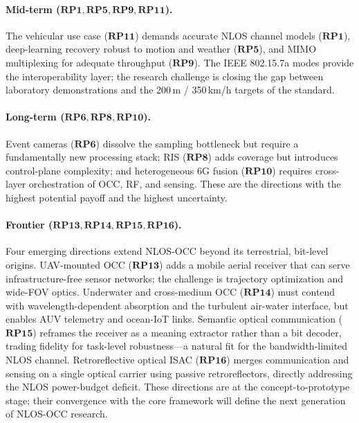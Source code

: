 \documentclass[10pt,a4paper]{article}
\newcommand{\rp}[1]{\textbf{RP#1}}
\begin{document}
\paragraph{Mid-term ($\rp{1}, \rp{5}, \rp{9}, \rp{11}$).}
The vehicular use case ($\rp{11}$) demands accurate NLOS channel models
($\rp{1}$), deep-learning recovery robust to motion and weather
($\rp{5}$), and MIMO multiplexing for adequate throughput ($\rp{9}$).
The IEEE 802.15.7a modes provide the interoperability layer; the
research challenge is closing the gap between laboratory demonstrations
and the 200\,m / 350\,km/h targets of the standard.

\paragraph{Long-term ($\rp{6}, \rp{8}, \rp{10}$).}
Event cameras ($\rp{6}$) dissolve the sampling bottleneck but require a
fundamentally new processing stack; RIS ($\rp{8}$) adds coverage but
introduces control-plane complexity; and heterogeneous 6G fusion
($\rp{10}$) requires cross-layer orchestration of OCC, RF, and sensing.
These are the directions with the highest potential payoff and the
highest uncertainty.

\paragraph{Frontier ($\rp{13}, \rp{14}, \rp{15}, \rp{16}$).}
Four emerging directions extend NLOS-OCC beyond its terrestrial,
bit-level origins. UAV-mounted OCC ($\rp{13}$) \cite{chang2026uavocc,
kondo2024farmocc} adds a mobile aerial receiver that can serve
infrastructure-free sensor networks; the challenge is trajectory
optimization and wide-FOV optics. Underwater and cross-medium OCC
($\rp{14}$) \cite{hamidnejad2023uwmimoocc, tsai2024uavwatertoair} must
contend with wavelength-dependent absorption and the turbulent
air-water interface, but enables AUV telemetry and ocean-IoT links.
Semantic optical communication ($\rp{15}$)
\cite{nennouche2025semanticuwoc, bostan2026crosslayer} reframes the
receiver as a meaning extractor rather than a bit decoder, trading
fidelity for task-level robustness---a natural fit for the
bandwidth-limited NLOS channel. Retroreflective optical ISAC
($\rp{16}$) \cite{du2025roisac} merges communication and sensing on a
single optical carrier using passive retroreflectors, directly
addressing the NLOS power-budget deficit. These directions are at the
concept-to-prototype stage; their convergence with the core framework
will define the next generation of NLOS-OCC research.
\end{document}
